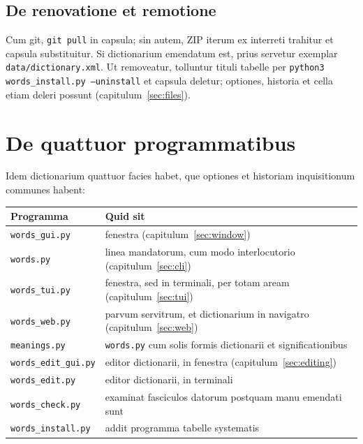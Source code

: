\documentclass[12pt,
              article,
              oneside
              ]{memoir}
\begin{document}
\subsection{De renovatione et remotione}

%
Cum git, \texttt{git pull} in capsula; sin autem, ZIP iterum ex
interreti trahitur et capsula substituitur. Si dictionarium emendatum
est, prius servetur exemplar \texttt{data/dictionary.xml}. Ut removeatur,
tolluntur tituli tabelle per \texttt{python3 words\_install.py
--uninstall} et capsula deletur; optiones, historia et cella etiam deleri
possunt (capitulum~\ref{sec:files}).

\section{De quattuor programmatibus}
\label{sec:programs}

%
Idem dictionarium quattuor facies habet, que optiones et historiam
inquisitionum communes habent:

\begin{longtable}{@{}lp{}@{}}
\toprule
Programma & Quid sit\\
\midrule
\endhead
\texttt{words\_gui.py} & fenestra (capitulum~\ref{sec:window})\\
\texttt{words.py} & linea mandatorum, cum modo interlocutorio (capitulum~\ref{sec:cli})\\
\texttt{words\_tui.py} & fenestra, sed in terminali, per totam aream (capitulum~\ref{sec:tui})\\
\texttt{words\_web.py} & parvum servitrum, et dictionarium in navigatro (capitulum~\ref{sec:web})\\
\texttt{meanings.py} & \texttt{words.py} cum solis formis dictionarii et significationibus\\
\texttt{words\_edit\_gui.py} & editor dictionarii, in fenestra (capitulum~\ref{sec:editing})\\
\texttt{words\_edit.py} & editor dictionarii, in terminali\\
\texttt{words\_check.py} & examinat fasciculos datorum postquam manu emendati sunt\\
\texttt{words\_install.py} & addit programma tabelle systematis\\
\bottomrule
\end{longtable}
\end{document}

